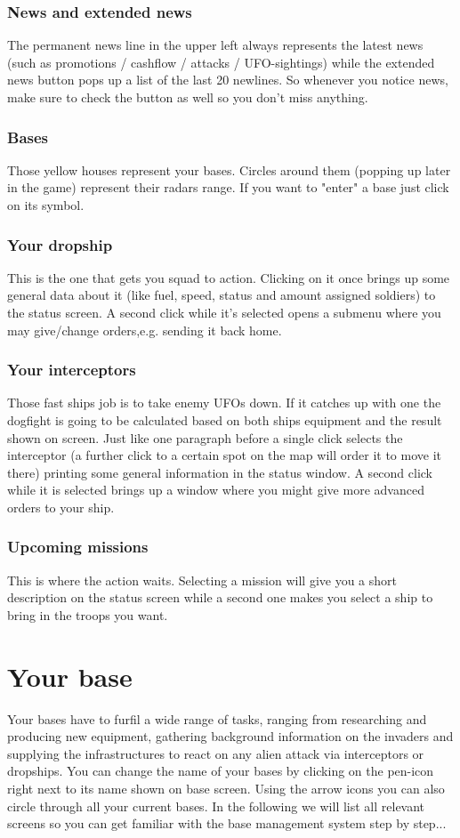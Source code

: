 \subsubsection{News and extended news}
The permanent news line in the upper left always represents the latest news (such as promotions / cashflow / attacks / UFO-sightings) while the extended news button pops up a list of the last 20 newlines.
So whenever you notice news, make sure to check the button as well so you don't miss anything. 
\subsubsection{Bases}
Those yellow houses represent your bases. Circles around them (popping up later in the game) represent their radars range.  If you want to "enter" a base just click on its symbol.
\subsubsection{Your dropship}
This is the one that gets you squad to action. Clicking on it once brings up some general data about it (like fuel, speed, status and amount assigned soldiers) to the status screen. A second click while it's selected opens a submenu where you may give/change orders,e.g. sending it back home.
\subsubsection{Your interceptors}
Those fast ships job is to take enemy UFOs down. If it catches up with one the dogfight is going to be calculated based on both ships equipment and the result shown on screen. Just like one paragraph before a single click selects the interceptor (a further click to a certain spot on the map will order it to move it there) printing some general information in the status window. A second click while it is selected brings up a window where you might give more advanced orders to your ship.
\subsubsection{Upcoming missions}
This is where the action waits. Selecting a mission will give you a short description on the status screen while a second one makes you select a ship to bring in the troops you want.


\section{Your base}
Your bases have to furfil a wide range of tasks, ranging from researching and producing new equipment, gathering background information on the invaders and supplying the infrastructures to react on any alien attack via interceptors or dropships. You can change the name of your bases by clicking on the pen-icon right next to its name shown on base screen. Using the arrow icons you can also circle through all your current bases. In the following we will list all relevant screens so you can get familiar with the base management system step by step...

